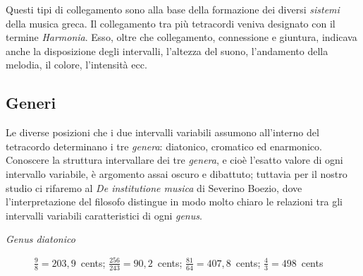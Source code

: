 Questi tipi di collegamento sono alla base della formazione dei diversi
\emph{sistemi} della musica greca. Il collegamento tra più tetracordi veniva
designato con il termine \emph{Harmonia}. Esso, oltre che collegamento,
connessione e giuntura, indicava anche la disposizione degli intervalli,
l'altezza del suono, l'andamento della melodia, il colore, l'intensità ecc.

\subsection{Generi}

Le diverse posizioni che i due intervalli variabili assumono all'interno del
tetracordo determinano i tre \emph{genera}: diatonico, cromatico ed
enarmonico. Conoscere la struttura intervallare dei tre \emph{genera}, e cioè
l'esatto valore di ogni intervallo variabile, è argomento assai oscuro e
dibattuto; tuttavia per il nostro studio ci rifaremo al \emph{De institutione
musica} di Severino Boezio, dove l'interpretazione del filosofo distingue in
modo molto chiaro le relazioni tra gli intervalli variabili caratteristici di
ogni \emph{genus}.


\vspace{10pt}
\textit{Genus diatonico}

\begin{figure}[htbp]
\centering
{}


\footnotesize
$\tfrac{9}{8} = 203{,}9$~cents; \quad
$\tfrac{256}{243} = 90{,}2$~cents; \quad
$\tfrac{81}{64} = 407{,}8$~cents; \quad
$\tfrac{4}{3} = 498$~cents
\end{figure}


